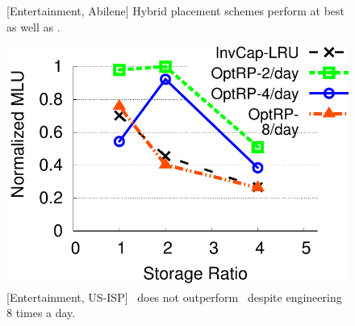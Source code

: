 \begin{figure}
\begin{minipage}[b]{0.31\linewidth}
\begin{center}
\end{center}
\vspace{-0.25in}
\caption{[Entertainment, Abilene] Hybrid placement schemes perform at best as well as \invlru.}
\label{fig:hybrid}
\end{minipage}
\hspace{0.2cm}
\begin{minipage}[b]{0.31\linewidth}
\begin{center}
\includegraphics[width=\textwidth]{graphSet1/tefrequency/ATTVideos.pdf}
\end{center}
\vspace{-0.25in}
\caption{[Entertainment, US-ISP] \optrp\ does not outperform  \invlru\ despite engineering  8 times a day.}
\label{fig:optrpfrequency}
\end{minipage}
\end{figure}



